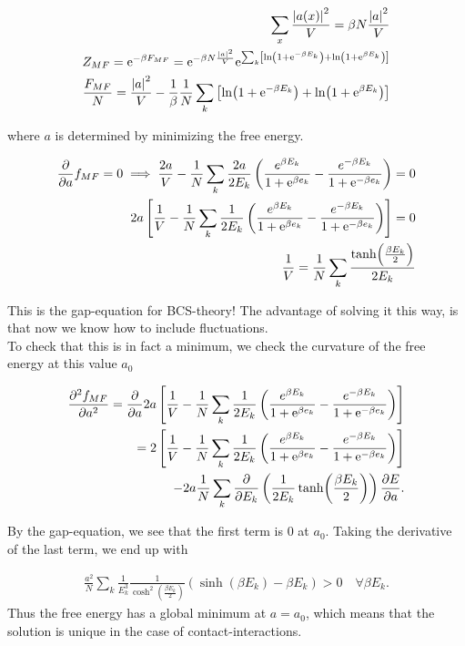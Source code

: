 \begin{align*}
    \sum_x \frac{\abs{a(x)}^2}{V} = \beta N \frac{\abs{a}^2}{V} \\ 
    Z_{MF} = \mathrm{e}^{-\beta F_{MF}} = \mathrm{e}^{-\beta N \frac{\abs{a}^2}{V}} \mathrm{e}^{\sum_k \left[\ln(1 + \mathrm{e}^{-\beta E_k}) + \ln(1 + \mathrm{e}^{\beta E_k})\right]} \\ 
    \frac{F_{MF}}{N} = \frac{\abs{a}^2}{V} - \frac{1}{\beta} \frac{1}{N}\sum_k \left[\ln(1 + \mathrm{e}^{-\beta E_k}) + \ln(1 + \mathrm{e}^{\beta E_k})\right]
\end{align*}

where $a$ is determined by minimizing the free energy. 

\begin{align*}
    \pdv{}{a}f_{MF} = 0 \implies \frac{2a}{V} - \frac{1}{N}\sum_k \frac{2a}{2E_k}\left(\frac{e^{\beta E_k}}{1 + \mathrm{e}^{\beta e_k}} - \frac{e^{-\beta E_k}}{1 + \mathrm{e}^{-\beta e_k}} \right) = 0 \\
    2a \left[\frac{1}{V} - \frac{1}{N}\sum_k \frac{1}{2E_k}\left(\frac{e^{\beta E_k}}{1 + \mathrm{e}^{\beta e_k}} - \frac{e^{-\beta E_k}}{1 + \mathrm{e}^{-\beta e_k}} \right) \right] = 0 \\ 
    \frac{1}{V} = \frac{1}{N} \sum_k \frac{\tanh(\frac{\beta E_k}{2})}{2E_k}
\end{align*}

This is the gap-equation for BCS-theory! The advantage of solving it this way, is that now we know how to include fluctuations. \\ 

To check that this is in fact a minimum, we check the curvature of the free energy at this value $a_0$

\begin{align*}
    \pdv{^2 f_{MF}}{a^2} = \pdv{}{a} 2a \left[\frac{1}{V} - \frac{1}{N}\sum_k \frac{1}{2E_k}\left(\frac{e^{\beta E_k}}{1 + \mathrm{e}^{\beta e_k}} - \frac{e^{-\beta E_k}}{1 + \mathrm{e}^{-\beta e_k}} \right) \right] \\ = 2\left[\frac{1}{V} - \frac{1}{N}\sum_k \frac{1}{2E_k}\left(\frac{e^{\beta E_k}}{1 + \mathrm{e}^{\beta e_k}} - \frac{e^{-\beta E_k}}{1 + \mathrm{e}^{-\beta e_k}} \right) \right] \\ - 2a \frac{1}{N} \sum_k \pdv{}{E_k}\left(\frac{1}{2E_k}\tanh(\frac{\beta E_k}{2})\right) \pdv{E}{a}.
\end{align*}

By the gap-equation, we see that the first term is $0$ at $a_0$. Taking the derivative of the last term, we end up with 

\begin{align*}
    \frac{a^2}{N}\sum_k \frac{1}{E_k ^3} \frac{1}{\cosh^2(\frac{\beta E_k}{2})} \left(\sinh(\beta E_k) - \beta E_k \right) > 0 \quad \forall \beta E_k.
\end{align*}
Thus the free energy has a global minimum at $a = a_0$, which means that the solution is unique in the case of contact-interactions. 

